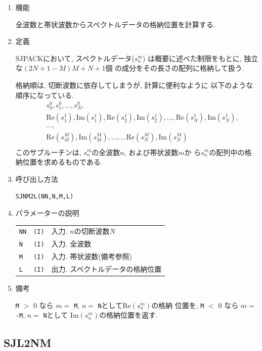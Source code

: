 \documentclass[a4j]{jarticle}
\begin{document}
\begin{enumerate}

\item 機能 

全波数と帯状波数からスペクトルデータの格納位置を計算する.

\item 定義

SJPACKにおいて, スペクトルデータ($s^m_n$)
は概要に述べた制限をもとに, 独立な$(2N+1-M)M+N+1$個
の成分をその長さの配列に格納して扱う.

格納順は, 切断波数に依存してしまうが, 計算に便利なように
以下のような順序になっている.
\begin{eqnarray*}
&& s^0_0, s^0_1, \ldots, s^0_N,\\
&& \mbox{Re}(s^1_1), \mbox{Im}(s^1_1),
\mbox{Re}(s^1_2), \mbox{Im}(s^1_2), \ldots, 
\mbox{Re}(s^1_N), \mbox{Im}(s^1_N),\\
&&\ldots,\\
&& \mbox{Re}(s^M_M), \mbox{Im}(s^M_M), \ldots,
\ldots \mbox{Re}(s^M_N), \mbox{Im}(s^M_N)\\
\end{eqnarray*}
このサブルーチンは, $s^m_n$の全波数$n$, および帯状波数$m$か
ら$s^m_n$の配列中の格納位置を求めるものである.

\item 呼び出し方法 
    
{\tt SJNM2L(NN,N,M,L)}
  
\item パラメーターの説明 

\begin{tabular}{lll}
{\tt NN} & {\tt (I)} & 入力. $n$の切断波数$N$\\
{\tt N} & {\tt (I)} & 入力. 全波数\\
{\tt M} & {\tt (I)} & 入力. 帯状波数(備考参照)\\
{\tt L} & {\tt (I)} & 出力. スペクトルデータの格納位置
\end{tabular}

\item 備考

{\tt M} $>$ 0 なら $m=$ {\tt M}, $n=$ {\tt N}として$\mbox{Re}(s^m_n)$の格納
位置を, {\tt M} $<$ 0 なら $m=$ {\tt -M}, $n=$ {\tt N}として
$\mbox{Im}(s^m_n)$の格納位置を返す.

\end{enumerate}


\subsection{SJL2NM}
\end{document}
